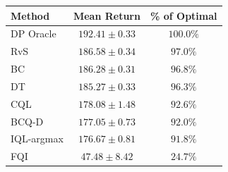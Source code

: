 \begin{tabular}{lcc}
\hline
Method & Mean Return & \% of Optimal \\
\hline
DP Oracle & $192.41 \pm 0.33$ & $100.0\%$ \\
RvS & $186.58 \pm 0.34$ & $97.0\%$ \\
BC & $186.28 \pm 0.31$ & $96.8\%$ \\
DT & $185.27 \pm 0.33$ & $96.3\%$ \\
CQL & $178.08 \pm 1.48$ & $92.6\%$ \\
BCQ-D & $177.05 \pm 0.73$ & $92.0\%$ \\
IQL-argmax & $176.67 \pm 0.81$ & $91.8\%$ \\
FQI & $47.48 \pm 8.42$ & $24.7\%$ \\
\hline
\end{tabular}
